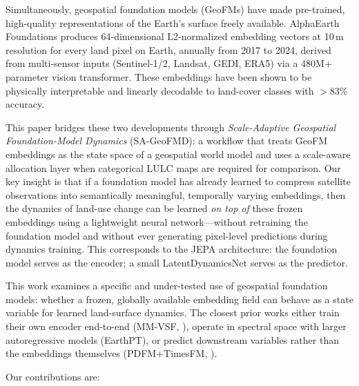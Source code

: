 \documentclass{article}
\begin{document}
Simultaneously, geospatial foundation models (GeoFMs) have made pre-trained, high-quality representations of the Earth's surface freely available. AlphaEarth Foundations \citep{brown2025alphaearth} produces 64-dimensional L2-normalized embedding vectors at 10\,m resolution for every land pixel on Earth, annually from 2017 to 2024, derived from multi-sensor inputs (Sentinel-1/2, Landsat, GEDI, ERA5) via a 480M+ parameter vision transformer. These embeddings have been shown to be physically interpretable \citep{rahman2026interpretable} and linearly decodable to land-cover classes with $>$83\% accuracy.

This paper bridges these two developments through \textit{Scale-Adaptive Geospatial Foundation-Model Dynamics} (SA-GeoFMD): a workflow that treats GeoFM embeddings as the state space of a geospatial world model and uses a scale-aware allocation layer when categorical LULC maps are required for comparison. Our key insight is that if a foundation model has already learned to compress satellite observations into semantically meaningful, temporally varying embeddings, then the dynamics of land-use change can be learned \textit{on top of} these frozen embeddings using a lightweight neural network---without retraining the foundation model and without ever generating pixel-level predictions during dynamics training. This corresponds to the JEPA architecture: the foundation model serves as the encoder; a small LatentDynamicsNet serves as the predictor.

This work examines a specific and under-tested use of geospatial foundation models: whether a frozen, globally available embedding field can behave as a state variable for learned land-surface dynamics. The closest prior works either train their own encoder end-to-end (MM-VSF, \citealt{mmvsf2024}), operate in spectral space with larger autoregressive models (EarthPT), or predict downstream variables rather than the embeddings themselves (PDFM+TimesFM, \citealt{google2024pdfm}).

Our contributions are:
\end{document}
